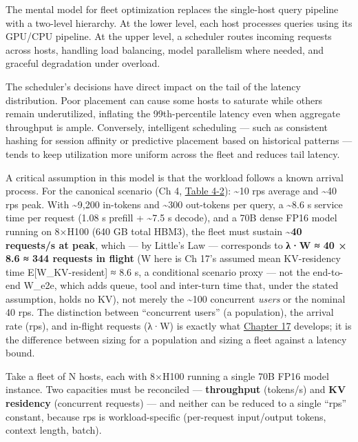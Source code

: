 \label{mental-model}


The mental model for fleet optimization replaces the single-host query
pipeline with a two-level hierarchy. At the lower level, each host
processes queries using its GPU/CPU pipeline. At the upper level, a
scheduler routes incoming requests across hosts, handling load
balancing, model parallelism where needed, and graceful degradation
under overload.

The scheduler's decisions have direct impact on the tail of the latency
distribution. Poor placement can cause some hosts to saturate while
others remain underutilized, inflating the 99th-percentile latency even
when aggregate throughput is ample. Conversely, intelligent scheduling
--- such as consistent hashing for session affinity or predictive
placement based on historical patterns --- tends to keep utilization
more uniform across the fleet and reduces tail latency.

A critical assumption in this model is that the workload follows a known
arrival process. For the canonical scenario (Ch 4, \hyperref[tab:4.2]{Table 4-2}):
\textasciitilde10 rps average and \textasciitilde40 rps peak. With
\textasciitilde9,200 in-tokens and \textasciitilde300 out-tokens per
query, a \textasciitilde8.6 s service time per request (1.08 s prefill +
\textasciitilde7.5 s decode), and a 70B dense FP16 model running on
8×H100 (640 GB total HBM3), the fleet must sustain
\textbf{\textasciitilde40 requests/s at peak}, which --- by Little's Law
--- corresponds to \textbf{λ·W ≈ 40 × 8.6 ≈ 344 requests in flight} (W
here is Ch 17's assumed mean KV-residency time E{[}W\_KV-resident{]} ≈
8.6 s, a conditional scenario proxy --- not the end-to-end W\_e2e, which
adds queue, tool and inter-turn time that, under the stated assumption,
holds no KV), not merely the \textasciitilde100 concurrent \emph{users}
or the nominal 40 rps. The distinction between ``concurrent users'' (a
population), the arrival rate (rps), and in-flight requests (λ·W) is
exactly what \hyperref[chap:17]{Chapter 17} develops; it is the difference between sizing
for a population and sizing a fleet against a latency bound.

\label{worked-example}


Take a fleet of N hosts, each with 8×H100 running a single 70B FP16
model instance. Two capacities must be reconciled ---
\textbf{throughput} (tokens/s) and \textbf{KV residency} (concurrent
requests) --- and neither can be reduced to a single ``rps'' constant,
because rps is workload-specific (per-request input/output tokens,
context length, batch).

